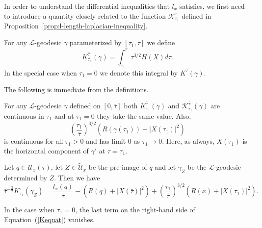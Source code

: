 In order to understand the differential inequalities that $l_x$
satisfies, we first need to introduce a quantity closely related to
the function ${\mathcal K}^{\bar\tau}_{\tau_1}$ defined in
Proposition~\ref{prop:l-length-laplacian-inequality}.

\begin{definition}\label{def:reduced-length-k-quantity}

For any ${\mathcal L}$-geodesic $\gamma$ parameterized by $[\tau_1,\bar\tau]$
we define
$$K_{\tau_1}^{\bar\tau}(\gamma)=
\int_{\tau_1}^{\bar\tau}\tau^{3/2}H(X)d\tau.$$
In the special case when $\tau_1=0$ we denote this integral by
$K^{\bar\tau}(\gamma)$.
\end{definition}

The following is immediate from the definitions.

\begin{lemma}\label{lem:k-quantity-continuity}
\label{Kequal}

For any ${\mathcal L}$-geodesic $\gamma$ defined on $[0,\bar\tau]$ both
$K^{\bar\tau}_{\tau_1}(\gamma)$ and ${\mathcal K}^{\bar\tau}_{\tau_1}(\gamma)$
are continuous in $\tau_1$ and at $\tau_1=0$ they take the same value. Also,
$$\left(\frac{\tau_1}{\bar\tau}\right)^{3/2}\left(R(\gamma(\tau_1))+|X(\tau_1)|^2\right)$$
is continuous for all $\tau_1> 0$ and has limit $0$ as
$\tau_1\rightarrow 0$. Here, as always, $X(\tau_1)$ is the
horizontal component of $\gamma'$ at $\tau=\tau_1$.
\end{lemma}

\begin{lemma}\label{lem:reduced-length-k-formula}
\label{Keqn}

Let $q\in {\mathcal
U}_x(\bar\tau)$, let $Z\in \widetilde {\mathcal U}_x$ be the
pre-image of $q$ and let $\gamma_Z$ be the ${\mathcal L}$-geodesic
determined by $Z$. Then we have
\begin{equation}\label{Kequat}
\bar\tau^{-\frac{3}{2}}K^{\bar\tau}_{\tau_1}(\gamma_Z)=\frac{
l_x(q)}{\bar\tau}-(R(q)
+|X(\bar\tau)|^2)+\left(\frac{\tau_1}{\bar\tau}\right)^{3/2}\left(R(x)+|X(\tau_1)|^2\right).
\end{equation}


In the case when $\tau_1=0$, the last term on the right-hand side of
Equation~(\ref{Kequat}) vanishes.
\end{lemma}


